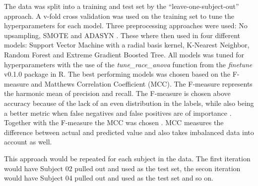 \documentclass[
]{article}
\begin{document}
The data was split into a training and test set by the
``leave-one-subject-out'' approach. A v-fold cross validation was used
on the training set to tune the hyperparameters for each model. Three
preprocessing approaches were used: No upsampling, SMOTE
\citep{Chawla2002} and ADASYN \citep{He2008}. These where then used in
four different models: Support Vector Machine with a radial basis
kernel, K-Nearest Neighbor, Random Forest and Extreme Gradient Boosted
Tree. All models was tuned for hyperparameters with the use of the
\emph{tune\_race\_anova} function from the \emph{finetune} v0.1.0
package in R. The best performing models was chosen based on the
F-measure and Matthews Correlation Coefficient (MCC). The F-measure
represents the harmonic mean of precision and recall. The F-measure is
chosen above accuracy because of the lack of an even distribution in the
labels, while also being a better metric when false negatives and false
positives are of importance \citep{Kelleher2015}. Together with the
F-measure the MCC was chosen \citep{Delgado2019}. MCC measures the
difference between actual and predicted value and also takes imbalanced
data into account as well.

This approach would be repeated for each subject in the data. The first
iteration would have Subject 02 pulled out and used as the test set, the
secon iteration would have Subject 04 pulled out and used as the test
set and so on.
\end{document}
